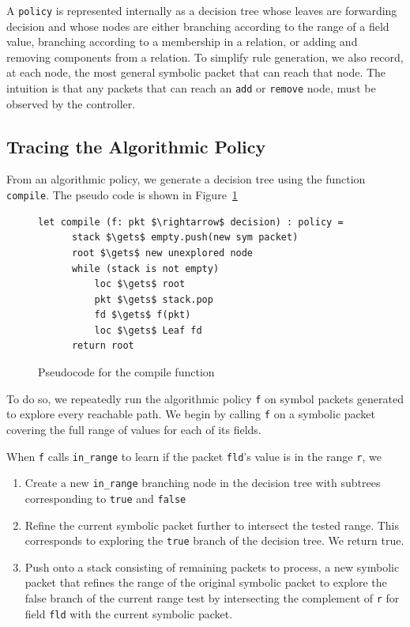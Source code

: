 \documentclass[nocopyrightspace]{sigplanconf}
\begin{document}
A \lstinline|policy| is represented internally as a decision tree whose leaves are forwarding decision and whose nodes are either branching according to the range of a field value, branching according to a membership in a relation, or adding and removing components from a relation. To simplify rule generation, we also record, at each node, the most general symbolic packet that can reach that node. The intuition is that any packets that can reach an \lstinline|add| or \lstinline|remove| node, must be observed by the controller.


\subsection*{Tracing the Algorithmic Policy}
From an algorithmic policy, we generate a decision tree using the function \lstinline|compile|. The pseudo code is shown in Figure~\ref{fig:compile-pseudo}

\begin{figure}[ht]
\begin{lstlisting}[mathescape]
let compile (f: pkt $\rightarrow$ decision) : policy =
      stack $\gets$ empty.push(new sym packet)
      root $\gets$ new unexplored node
      while (stack is not empty)
          loc $\gets$ root
          pkt $\gets$ stack.pop
          fd $\gets$ f(pkt) 
          loc $\gets$ Leaf fd
      return root    
\end{lstlisting}
\caption{Pseudocode for the compile function}
\label{fig:compile-pseudo}
\end{figure}

To do so, we repeatedly run the algorithmic policy \lstinline|f| on symbol packets generated to explore every reachable path.
We begin by calling \lstinline|f| on a symbolic packet covering the full range of values for each of its fields.

When \lstinline|f| calls \lstinline|in_range| to learn if the packet \lstinline|fld|'s value is in the range \lstinline|r|, we
\begin{enumerate}
\item  Create a new \lstinline|in_range| branching node in the decision tree with subtrees corresponding to \lstinline|true| and \lstinline|false|
\item Refine the current symbolic packet further to intersect the tested range. This corresponds to exploring the \lstinline|true| branch of the decision tree. We return true. 
\item Push onto a stack consisting of remaining packets to process, a new symbolic packet that refines the range of the original symbolic packet to explore the false branch of the current range test by intersecting the complement of \lstinline|r| for field \lstinline|fld| with the current symbolic packet.
\end{enumerate}
\end{document}
